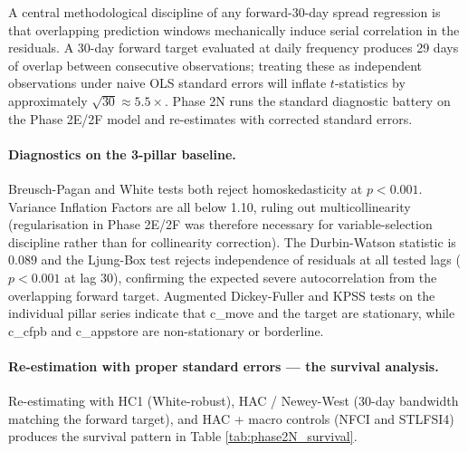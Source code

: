 \documentclass[11pt,a4paper]{article}
\begin{document}
A central methodological discipline of any forward-30-day spread regression is that overlapping prediction windows mechanically induce serial correlation in the residuals. A 30-day forward target evaluated at daily frequency produces 29 days of overlap between consecutive observations; treating these as independent observations under naive OLS standard errors will inflate $t$-statistics by approximately $\sqrt{30} \approx 5.5\times$. Phase 2N runs the standard diagnostic battery on the Phase 2E/2F model and re-estimates with corrected standard errors.

\paragraph{Diagnostics on the 3-pillar baseline.} Breusch-Pagan and White tests both reject homoskedasticity at $p < 0.001$. Variance Inflation Factors are all below 1.10, ruling out multicollinearity (regularisation in Phase 2E/2F was therefore necessary for variable-selection discipline rather than for collinearity correction). The Durbin-Watson statistic is $0.089$ and the Ljung-Box test rejects independence of residuals at all tested lags ($p < 0.001$ at lag 30), confirming the expected severe autocorrelation from the overlapping forward target. Augmented Dickey-Fuller and KPSS tests on the individual pillar series indicate that c\_move and the target are stationary, while c\_cfpb and c\_appstore are non-stationary or borderline.

\paragraph{Re-estimation with proper standard errors --- the survival analysis.} Re-estimating with HC1 (White-robust), HAC / Newey-West (30-day bandwidth matching the forward target), and HAC + macro controls (NFCI and STLFSI4) produces the survival pattern in Table \ref{tab:phase2N_survival}.
\end{document}
